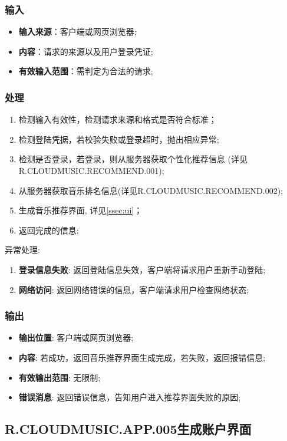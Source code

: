 \subsubsection{输入}
	\begin{itemize}
		\item \textbf{输入来源}：客户端或网页浏览器;
		\item \textbf{内容}：请求的来源以及用户登录凭证;
		\item \textbf{有效输入范围}：需判定为合法的请求;
	\end{itemize}
\subsubsection{处理}
	\begin{enumerate}
		\item 检测输入有效性，检测请求来源和格式是否符合标准；
		\item 检测登陆凭据，若校验失败或登录超时，抛出相应异常;
		\item 检测是否登录，若登录，则从服务器获取个性化推荐信息
		(详见R.CLOUDMUSIC.RECOMMEND.001);
		\item 从服务器获取音乐排名信息(详见R.CLOUDMUSIC.RECOMMEND.002);
		\item 生成音乐推荐界面, 详见\ref{ssec:ui}；
		\item 返回完成的信息;
	\end{enumerate}
	\noindent 异常处理: 
	\begin{enumerate}
		\item \textbf{登录信息失败}: 返回登陆信息失效，客户端将请求用户重新手动登陆;
		\item \textbf{网络访问}: 返回网络错误的信息，客户端请求用户检查网络状态;
	\end{enumerate}
\subsubsection{输出}
\begin{itemize}
	\item \textbf{输出位置}: 客户端或网页浏览器;
	\item \textbf{内容}: 若成功，返回音乐推荐界面生成完成，若失败，返回报错信息;
	\item \textbf{有效输出范围}: 无限制;
	\item \textbf{错误消息}: 返回错误信息，告知用户进入推荐界面失败的原因;
\end{itemize}

\subsection{R.CLOUDMUSIC.APP.005生成账户界面}
